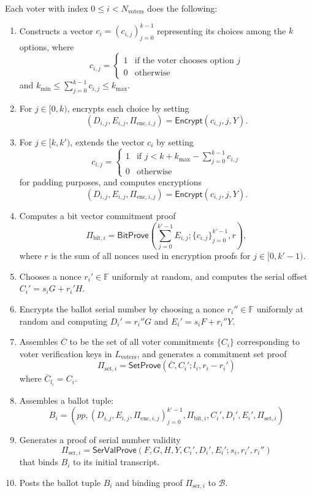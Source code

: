 \documentclass{llncs}
\newcommand{\F}{\mathbb{F}}
\newcommand{\func}[1]{\mathsf{#1}}
\begin{document}
Each voter with index $0 \leq i < N_{\text{voters}}$ does the following:
\begin{enumerate}
    \item Constructs a vector $c_i = (c_{i,j})_{j=0}^{k-1}$ representing its choices among the $k$ options, where
    \begin{displaymath}
        c_{i,j} = \left\{
        \begin{array}{ll}
            1 & \text{if the voter chooses option } j \\
            0 & \text{otherwise}
        \end{array}
        \right.
    \end{displaymath}
    and $k_{\text{min}} \leq \sum_{j=0}^{k-1} c_{i,j} \leq k_{\text{max}}$.
    \item For $j \in [0,k)$, encrypts each choice by setting \[ (D_{i,j}, E_{i,j}, \Pi_{\text{enc},i,j}) = \func{Encrypt}(c_{i,j}, j, Y). \]
    \item For $j \in [k,k')$, extends the vector $c_i$ by setting
    \begin{displaymath}
        c_{i,j} = \left\{
        \begin{array}{ll}
            1 & \text{if } j < k + k_{\text{max}} - \sum_{j=0}^{k-1} c_{i,j} \\
            0 & \text{otherwise}
        \end{array}
        \right.
    \end{displaymath}
    for padding purposes, and computes encryptions \[ (D_{i,j}, E_{i,j}, \Pi_{\text{enc},i,j}) = \func{Encrypt}(c_{i,j}, j, Y). \]
    \item Computes a bit vector commitment proof \[ \Pi_{\text{bit},i} = \func{BitProve}\left( \sum_{j=0}^{k'-1} E_{i,j} ; \{c_{i,j}\}_{j=0}^{k'-1}, r \right), \] where $r$ is the sum of all nonces used in encryption proofs for $j \in [0,k'-1)$.
    \item Chooses a nonce $r_i' \in \F$ uniformly at random, and computes the serial offset $C_i' = s_i G + r_i' H$.
    \item Encrypts the ballot serial number by choosing a nonce $r_i'' \in \F$ uniformly at random and computing $D_i' = r_i'' G$ and $E_i' = s_i F + r_i'' Y$.
    \item Assembles $\overline{C}$ to be the set of all voter commitments $\{C_i\}$ corresponding to voter verification keys in $L_{\text{voters}}$, and generates a commitment set proof
    \[ \Pi_{\text{set},i} = \func{SetProve}\left(\overline{C}, C_i' ; l_i, r_i - r_i' \right) \]
    where $\overline{C}_{l_i} = C_i$.
    \item Assembles a ballot tuple:
    \[ B_i = \left( pp, (D_{i,j}, E_{i,j}, \Pi_{\text{enc},i,j})_{j=0}^{k'-1}, \Pi_{\text{bit},i}, C_i', D_i', E_i', \Pi_{\text{set},i} \right) \]
    \item Generates a proof of serial number validity
    \[ \Pi_{\text{ser},i} = \func{SerValProve}(F, G, H, Y, C_i', D_i', E_i' ; s_i, r_i', r_i'') \]
    that binds $B_i$ to its initial transcript.
    \item Posts the ballot tuple $B_i$ and binding proof $\Pi_{\text{ser},i}$ to $\mathcal{B}$.
\end{enumerate}
\end{document}
